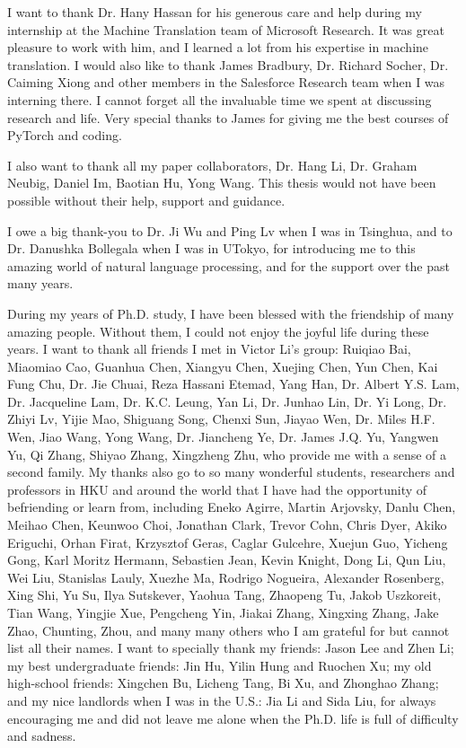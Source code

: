  I want to thank Dr. Hany Hassan for his generous care and help during my internship at the Machine Translation team of Microsoft Research. 
 It was great pleasure to work with him, and I learned a lot from his expertise in machine translation. 
 I would also like to thank James Bradbury, Dr. Richard Socher, Dr. Caiming Xiong and other members in the Salesforce Research team when I was interning there. I cannot forget all the invaluable time we spent at discussing research and life. Very special thanks to James for giving me the best courses of PyTorch and coding.
 
 I also want to thank all my paper collaborators, 
 Dr. Hang Li, 
 Dr. Graham Neubig, 
 Daniel Im,
 Baotian Hu,
 Yong Wang.
 This thesis would not have been possible without their help, support and guidance.
 
I owe a big thank-you to Dr. Ji Wu and Ping Lv when I was in Tsinghua, and to Dr. Danushka Bollegala when I was  in UTokyo, for introducing me to this amazing world of natural language processing, and for the support over the past many years.
 
During my years of Ph.D. study, I have been blessed with the friendship of many amazing people. Without them, I could not enjoy the joyful life during these years.
I want to thank all friends I met in Victor Li's group:
Ruiqiao Bai,
Miaomiao Cao,
Guanhua Chen,
Xiangyu Chen,
Xuejing Chen,
Yun Chen,
Kai Fung Chu,
Dr. Jie Chuai,
Reza Hassani Etemad,
Yang Han,
Dr. Albert Y.S. Lam,
Dr. Jacqueline Lam,
Dr. K.C. Leung,
Yan Li,
Dr. Junhao Lin,
Dr. Yi Long,
Dr. Zhiyi Lv,
Yijie Mao,
Shiguang Song,
Chenxi Sun,
Jiayao Wen,
Dr. Miles H.F. Wen,
Jiao Wang,
Yong Wang,
Dr. Jiancheng Ye,
Dr. James J.Q. Yu,
Yangwen Yu,
Qi Zhang,
Shiyao Zhang,
Xingzheng Zhu,
who provide me with a sense of a second family.
My thanks also go to so many wonderful students, researchers and professors in HKU and around the world that I have had the opportunity of befriending or learn from, including
Eneko Agirre,
Martin Arjovsky,
Danlu Chen,
Meihao Chen,
Keunwoo Choi,
Jonathan Clark,
Trevor Cohn,
Chris Dyer,
Akiko Eriguchi,
Orhan Firat,
Krzysztof Geras,
Caglar Gulcehre,
Xuejun Guo,
Yicheng Gong,
Karl Moritz Hermann,
Sebastien Jean,
Kevin Knight,
Dong Li,
Qun Liu,
Wei Liu,
Stanislas Lauly,
Xuezhe Ma,
Rodrigo Nogueira,
Alexander Rosenberg,
Xing Shi,
Yu Su,
Ilya Sutskever,
Yaohua Tang,
Zhaopeng Tu,
Jakob Uszkoreit,
Tian Wang,
Yingjie Xue,
Pengcheng Yin,
Jiakai Zhang,
Xingxing Zhang,
Jake Zhao,
Chunting, Zhou,
 and many many others who I am grateful for but cannot list all their names. 
I want to specially thank my friends: Jason Lee and Zhen Li;
my best undergraduate friends: Jin Hu,  Yilin Hung and Ruochen Xu;
my old high-school friends: Xingchen Bu,  Licheng Tang, Bi Xu, and  Zhonghao Zhang;
and my nice landlords when I was in the U.S.: Jia Li and Sida Liu,
 for always encouraging me and did not leave me alone when the Ph.D. life is full of difficulty and sadness.


